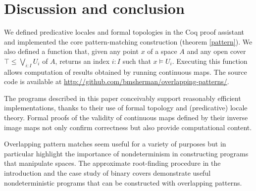 \documentclass[conference]{IEEEtran}
\newcommand{\grammar}[1]{\textcolor{red}{\underline{#1}}}
\newcommand{\FutureWork}[1]{}
\renewcommand{\grammar}[1]{#1}
\begin{document}
\section{Discussion and conclusion}

We defined predicative locales and formal topologies in the Coq proof assistant and implemented the core pattern-matching construction (theorem \ref{pattern}). We also defined a function that, given any point $x$ of a space $A$ and any open cover $\top \le \bigvee_{i : I} U_i$ of $A$, returns an index $i : I$ such that $x \models U_i$. Executing this function allows computation of results obtained by running continuous maps. The source code is available at \url{http://github.com/bmsherman/overlapping-patterns/}.

The programs described in this paper conceivably support reasonably efficient implementations, thanks to their use of formal topology and (predicative) locale theory. Formal proofs of the validity of continuous maps defined by their inverse image maps not only confirm correctness but also provide computational content.

Overlapping pattern matches seem useful for a variety of purposes but in particular highlight the  importance of nondeterminism in constructing programs that manipulate spaces. The approximate root-finding procedure in the introduction and the case study of binary covers demonstrate useful nondeterministic programs that can be constructed with overlapping patterns.


\FutureWork{A possible direction of future work would be to extend overlapping patterns to the gros topos $\mathcal{E}$ over \textbf{FSpc} with the previously described open cover topology. For instance, we might want to have an overlapping pattern match that nondeterministically returns a \emph{function}, rather than simply a point of a space. Since \textbf{Spc} and \textbf{FSpc} lack exponentials in general, making sense of \grammar{this} would require extending the constructs defined here to $\mathcal{E}$.}




\end{document}
